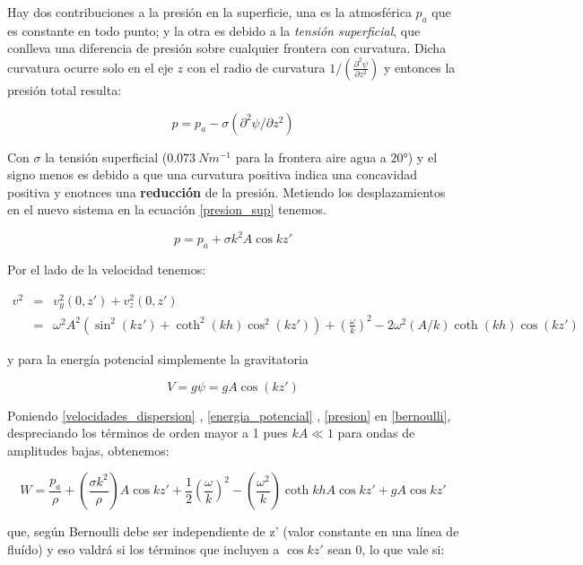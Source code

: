\documentclass[a4paper,spanish]{article}
\numberwithin{equation}{section}
\begin{document}
Hay dos contribuciones a la presi\'on en la superficie, una es la atmosf\'erica $p_a$ que es constante en todo punto; y la otra es debido a la \textit{tensi\'on superficial}, que conlleva una diferencia de presi\'on sobre cualquier frontera con curvatura. Dicha curvatura ocurre solo en el eje $z$  con el radio de curvatura $1/(\frac{\partial^2 \psi}{\partial z^2})$ y entonces la presi\'on total resulta:

\begin{equation}
p=p_a - \sigma(\partial^2 \psi / \partial z ^2)
\label{presion_sup}
\end{equation}

Con $\sigma$ la tensi\'on superficial ($0.073 \ Nm^{-1}$ para la frontera aire agua a $20°$) y el signo menos es debido a que una curvatura positiva indica una concavidad positiva y enotnces una \textbf{reducci\'on} de la presi\'on. Metiendo los desplazamientos en el nuevo sistema en la ecuaci\'on \ref{presion_sup} tenemos.

\begin{equation}
p=p_a+\sigma k^2 A \cos{kz'}
\label{presion}
\end{equation}

Por el lado de la velocidad tenemos:

\begin{equation}
\begin{array}{rcl}
v^2 & = & v_y^2 (0,z') + v_z^2(0,z') \\
& = & \omega ^2 A^2 \left(\sin^2(kz')+\coth^2(kh)\cos^2(kz')\right) + \left(\frac{\omega}{k}\right)^2 -2\omega^2 (A/k)\coth(kh)\cos(kz')
\end{array}
\label{velocidades_dispersion}
\end{equation}

y para la energ\'ia potencial simplemente la gravitatoria

\begin{equation}
V=g\psi=gA\cos(kz')
\label{energia_potencial}
\end{equation}

Poniendo \ref{velocidades_dispersion} , \ref{energia_potencial} , \ref{presion} en \ref{bernoulli}, despreciando los t\'erminos de orden mayor a 1 pues $kA\ll 1$ para ondas de amplitudes bajas, obtenemos:

\[
W= \frac{p_a}{\rho} + (\frac{\sigma k^2}{\rho}) A \cos{kz'} + \frac{1}{2}(\frac{\omega}{k})^2 - (\frac{\omega^2}{k}) \coth {kh} A \cos {kz'} + g A \cos {kz'}
\]

que, seg\'un Bernoulli debe ser independiente de z' (valor constante en una l\'inea de flu\'ido) y eso valdr\'a si los t\'erminos que incluyen a $\cos {kz'}$ sean $0$, lo que vale si:
\end{document}
